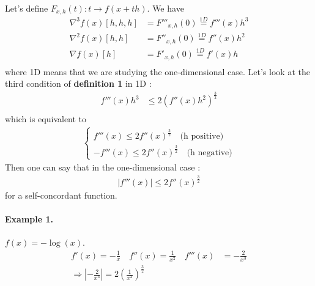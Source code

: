 Let's define $F_{x,h}(t) : t \rightarrow f(x+th)$. We have
\begin{align*}
\nabla^3 f(x)[h,h,h] & = F'''_{x,h}(0) \stackrel{1D}{=} f'''(x)h^3 \\
\nabla^2 f(x)[h,h] & = F''_{x,h}(0) \stackrel{1D}{=} f''(x)h^2\\
\nabla f(x)[h] & = F'_{x,h}(0) \stackrel{1D}{=} f'(x)h\\
\end{align*}
where 1D means that we are studying the one-dimensional case. Let's look at the third condition of \textbf{definition 1} in 1D :
\begin{align*}
f'''(x)h^3 & \le 2 (f''(x)h^2)^\frac{3}{2} \\
\end{align*}
which is equivalent to
\begin{align*}
\left\{
\begin{aligned}
f'''(x) \le 2f''(x)^\frac{3}{2} \quad \text{(h positive)} \\
-f'''(x) \le 2f''(x)^\frac{3}{2} \quad \text{(h negative)}
\end{aligned}
\right.
\end{align*}
Then one can say that in the one-dimensional case :
\begin{align*}
|f'''(x)| \le 2f''(x)^\frac{3}{2}
\end{align*}
for a self-concordant function.
\paragraph{Example 1.} $f(x) = -\log{(x)}$. 
\begin{align*}
f'(x) = -\frac{1}{x} \quad f''(x) = \frac{1}{x^2} \quad f'''(x) & = -\frac{2}{x^3} \\
\Rightarrow \left|-\frac{2}{x^3}\right| = 2 \left(\frac{1}{x^2}\right)^\frac{3}{2}
\end{align*}


